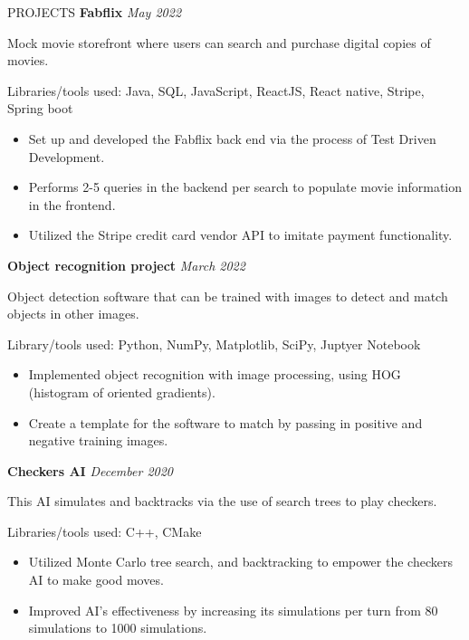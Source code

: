 \documentclass{ResumeFormat} %
\begin{document}
\begin{rSection}{PROJECTS}
\textbf{Fabflix} {} \hfill {\emph{May 2022}} %

Mock movie storefront where users can search and purchase digital copies of movies.

Libraries/tools used: Java, SQL, JavaScript, ReactJS, React native, Stripe, Spring boot
\begin{itemize}
    \itemsep -3pt {}
     \item Set up and developed the Fabflix back end via the process of Test Driven Development.
     \item Performs 2-5 queries in the backend per search to populate movie information in the frontend.
     \item Utilized the Stripe credit card vendor API to imitate payment functionality.
 \end{itemize}

\textbf{Object recognition project} {} \hfill {\emph{March 2022}}

Object detection software that can be trained with images to detect and match objects in other images.

Library/tools used: Python, NumPy, Matplotlib, SciPy, Juptyer Notebook
\begin{itemize}
    \itemsep -3pt {} 
     \item Implemented object recognition with image processing, using HOG (histogram of oriented gradients).
     \item Create a template for the software to match by passing in positive and negative training images.
 \end{itemize}

\textbf{Checkers AI} {} \hfill {\emph{December 2020}}

This AI simulates and backtracks via the use of search trees to play checkers.

Libraries/tools used: C++, CMake
\begin{itemize}
    \itemsep -3pt {}
     \item Utilized Monte Carlo tree search, and backtracking to empower the checkers AI to make good moves.
     \item Improved AI's effectiveness by increasing its simulations per turn from 80 simulations to 1000 simulations.
 \end{itemize}


\end{rSection}
\end{document}
